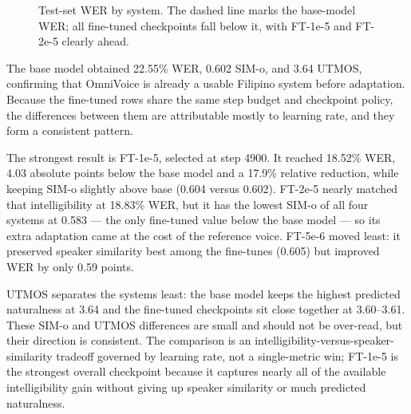 \documentclass[sigconf,nonacm]{acmart}
\begin{document}
\begin{figure}[t]
  \centering
  \caption{Test-set WER by system. The dashed line marks the base-model WER; all fine-tuned checkpoints fall below it, with FT-1e-5 and FT-2e-5 clearly ahead.}
  \label{fig:wer-chart}
\end{figure}

The base model obtained 22.55\% WER, 0.602 SIM-o, and 3.64 UTMOS, confirming that OmniVoice is already a usable Filipino system before adaptation. Because the fine-tuned rows share the same step budget and checkpoint policy, the differences between them are attributable mostly to learning rate, and they form a consistent pattern.

The strongest result is FT-1e-5, selected at step 4900. It reached 18.52\% WER, 4.03 absolute points below the base model and a 17.9\% relative reduction, while keeping SIM-o slightly above base (0.604 versus 0.602). FT-2e-5 nearly matched that intelligibility at 18.83\% WER, but it has the lowest SIM-o of all four systems at 0.583 --- the only fine-tuned value below the base model --- so its extra adaptation came at the cost of the reference voice. FT-5e-6 moved least: it preserved speaker similarity best among the fine-tunes (0.605) but improved WER by only 0.59 points.

UTMOS separates the systems least: the base model keeps the highest predicted naturalness at 3.64 and the fine-tuned checkpoints sit close together at 3.60--3.61. These SIM-o and UTMOS differences are small and should not be over-read, but their direction is consistent. The comparison is an intelligibility-versus-speaker-similarity tradeoff governed by learning rate, not a single-metric win; FT-1e-5 is the strongest overall checkpoint because it captures nearly all of the available intelligibility gain without giving up speaker similarity or much predicted naturalness.
\end{document}
